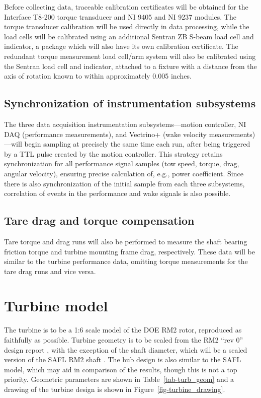 \documentclass[12pt,letterpaper]{scrreprt}
\begin{document}
Before collecting data, traceable calibration certificates will be obtained for
the Interface T8-200 torque transducer and NI 9405 and NI 9237 modules. The
torque transducer calibration will be used directly in data processing, while
the load cells will be calibrated using an additional Sentran ZB S-beam load
cell and indicator, a package which will also have its own calibration
certificate. The redundant torque measurement load cell/arm system will also be
calibrated using the Sentran load cell and indicator, attached to a fixture with
a distance from the axis of rotation known to within approximately 0.005 inches.

\subsection{Synchronization of instrumentation subsystems}

The three data acquisition instrumentation subsystems---motion controller, NI
DAQ (performance measurements), and Vectrino+ (wake velocity
measurements)---will begin sampling at precisely the same time each run, after
being triggered by a TTL pulse created by the motion controller. This strategy
retains synchronization for all performance signal samples (tow speed, torque,
drag, angular velocity), ensuring precise calculation of, e.g., power
coefficient. Since there is also synchronization of the initial sample from each
three subsystems, correlation of events in the performance and wake signals is
also possible.

\subsection{Tare drag and torque compensation} 

Tare torque and drag runs will also be performed to measure the shaft bearing
friction torque and turbine mounting frame drag, respectively. These data will
be similar to the turbine performance data, omitting torque measurements for the
tare drag runs and vice versa.

\section{Turbine model}

The turbine is to be a 1:6 scale model of the DOE RM2 rotor, reproduced as
faithfully as possible. Turbine geometry is to be scaled from the RM2 ``rev 0''
design report \cite{Barone2011}, with the exception of the shaft diameter, which
will be a scaled version of the SAFL RM2 shaft \cite{Hill2014}. The hub design
is also similar to the SAFL model, which may aid in comparison of the results,
though this is not a top priority. Geometric parameters are shown in
Table~\ref{tab-turb_geom} and a drawing of the turbine design is shown in
Figure~\ref{fig-turbine_drawing}. 
\end{document}
